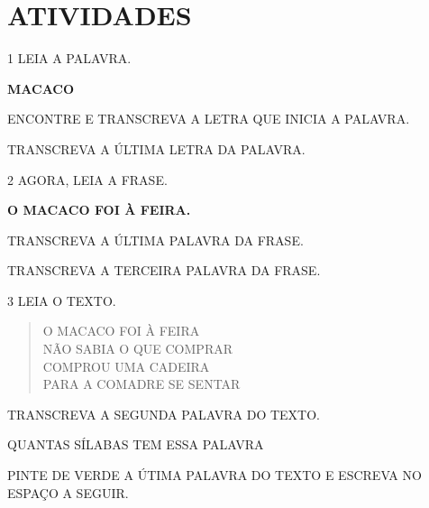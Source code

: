 
\section*{ATIVIDADES}


\num{1} LEIA A PALAVRA.

\begin{myquote}
\textbf{MACACO}
\end{myquote}

\begin{escolha}
\item ENCONTRE E TRANSCREVA A LETRA QUE INICIA A PALAVRA.

\item TRANSCREVA A ÚLTIMA LETRA DA PALAVRA.
\end{escolha}

\num{2} AGORA, LEIA A FRASE.

\begin{myquote}
\textbf{O MACACO FOI À FEIRA.}
\end{myquote}

\begin{escolha}
\item TRANSCREVA A ÚLTIMA PALAVRA DA FRASE.

\item TRANSCREVA A TERCEIRA PALAVRA DA FRASE.
\end{escolha}\enlargethispage{5\baselineskip}

\num{3} LEIA O TEXTO.

\begin{myquote}
\begin{verse}
O MACACO FOI À FEIRA\\
NÃO SABIA O QUE COMPRAR\\
COMPROU UMA CADEIRA\\
PARA A COMADRE SE SENTAR
\end{verse}

\end{myquote}
\pagebreak

\begin{escolha}
\item TRANSCREVA A SEGUNDA PALAVRA DO TEXTO.

\item QUANTAS SÍLABAS TEM ESSA PALAVRA

\item PINTE DE VERDE A ÚTIMA PALAVRA DO TEXTO E ESCREVA NO ESPAÇO A SEGUIR.
\end{escolha}


